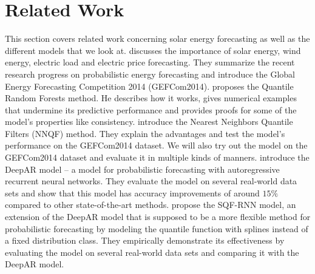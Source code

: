 \section{Related Work}
\label{sec:related-work}

This section covers related work concerning solar energy forecasting as well as 
the different models that we look at. 
\Textcite{Hong2016} discusses the importance of solar energy, wind energy, electric load 
and electric price forecasting. They summarize the recent research progress on probabilistic 
energy forecasting and introduce the Global Energy Forecasting Competition 2014 (GEFCom2014).
\Textcite{Meinshausen2006} proposes the Quantile Random Forests method. He describes 
how it works, gives numerical examples that undermine its predictive performance
and provides proofs for some of the model's properties like consistency. 
\Textcite{Ordiano2019} introduce the Nearest Neighbors Quantile Filters (NNQF) method. 
They explain the advantages and test the model's performance on the GEFCom2014 dataset. 
We will also try out the model on the GEFCom2014 dataset and evaluate 
it in multiple kinds of manners.
\Textcite{Salinas2017} introduce the DeepAR model -- a model for probabilistic forecasting 
with autoregressive recurrent neural networks. They evaluate the model on several 
real-world data sets and show that this model has accuracy improvements of around 
\(15\%\) compared to other state-of-the-art methods.
\Textcite{Gasthaus2019} propose the SQF-RNN model, an extension of the DeepAR model 
that is supposed to be a more flexible method for probabilistic forecasting 
by modeling the quantile function with splines instead of a fixed distribution class.
They empirically demonstrate its effectiveness by evaluating the model on several real-world 
data sets and comparing it with the DeepAR model.